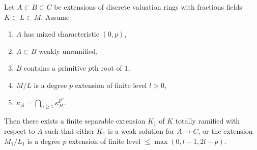 %
\begin{lemma}
\label{lemma-lowering-the-level}
Let $A \subset B \subset C$ be extensions of discrete valuation rings
with fractions fields $K \subset L \subset M$. Assume
\begin{enumerate}
\item $A$ has mixed characteristic $(0, p)$,
\item $A \subset B$ weakly unramified,
\item $B$ contains a primitive $p$th root of $1$,
\item $M/L$ is a degree $p$ extension of finite level $l > 0$,
\item $\kappa_A = \bigcap_{n \geq 1} \kappa_B^{p^n}$.
\end{enumerate}
Then there exists a finite separable extension $K_1$ of $K$
totally ramified with respect to $A$
such that either $K_1$ is a weak solution for $A \to C$, or the extension
$M_1/L_1$ is a degree $p$ extension of finite level
$\leq \max(0, l - 1, 2l - p)$.
\end{lemma}

